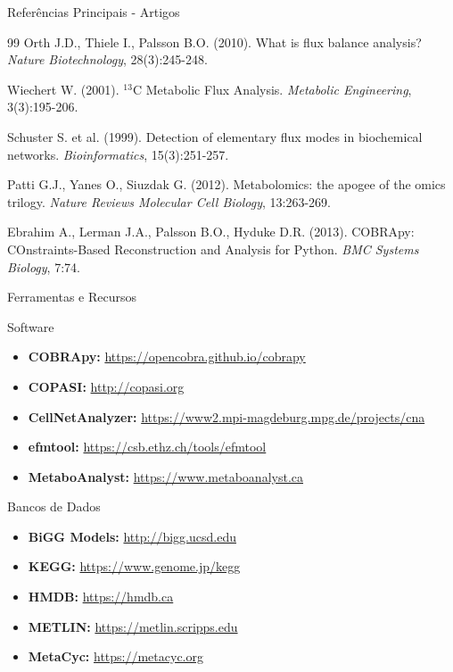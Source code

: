\begin{frame}{Referências Principais - Artigos}
\begin{thebibliography}{99}
 Orth J.D., Thiele I., Palsson B.O. (2010). What is flux balance analysis? \textit{Nature Biotechnology}, 28(3):245-248.

 Wiechert W. (2001). $^{13}$C Metabolic Flux Analysis. \textit{Metabolic Engineering}, 3(3):195-206.

 Schuster S. et al. (1999). Detection of elementary flux modes in biochemical networks. \textit{Bioinformatics}, 15(3):251-257.

 Patti G.J., Yanes O., Siuzdak G. (2012). Metabolomics: the apogee of the omics trilogy. \textit{Nature Reviews Molecular Cell Biology}, 13:263-269.

 Ebrahim A., Lerman J.A., Palsson B.O., Hyduke D.R. (2013). COBRApy: COnstraints-Based Reconstruction and Analysis for Python. \textit{BMC Systems Biology}, 7:74.
\end{thebibliography}
\end{frame}

\begin{frame}{Ferramentas e Recursos}
\begin{block}{Software}
\begin{itemize}
    \item \textbf{COBRApy:} \url{https://opencobra.github.io/cobrapy}
    \item \textbf{COPASI:} \url{http://copasi.org}
    \item \textbf{CellNetAnalyzer:} \url{https://www2.mpi-magdeburg.mpg.de/projects/cna}
    \item \textbf{efmtool:} \url{https://csb.ethz.ch/tools/efmtool}
    \item \textbf{MetaboAnalyst:} \url{https://www.metaboanalyst.ca}
\end{itemize}
\end{block}

\begin{block}{Bancos de Dados}
\begin{itemize}
    \item \textbf{BiGG Models:} \url{http://bigg.ucsd.edu}
    \item \textbf{KEGG:} \url{https://www.genome.jp/kegg}
    \item \textbf{HMDB:} \url{https://hmdb.ca}
    \item \textbf{METLIN:} \url{https://metlin.scripps.edu}
    \item \textbf{MetaCyc:} \url{https://metacyc.org}
\end{itemize}
\end{block}
\end{frame}

